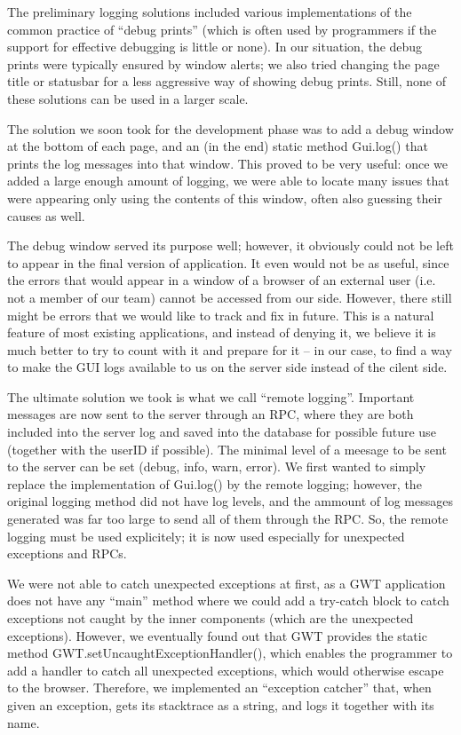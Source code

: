 The preliminary logging solutions included various implementations of the common practice of ``debug prints'' (which is often used by programmers if the support for effective debugging is little or none). In our situation, the debug prints were typically ensured by window alerts; we also tried changing the page title or statusbar for a less aggressive way of showing debug prints. Still, none of these solutions can be used in a larger scale.

The solution we soon took for the development phase was to add a debug window at the bottom of each page, and an (in the end) static method Gui.log() that prints the log messages into that window.
This proved to be very useful: once we added a large enough amount of logging, we were able to locate many issues that were appearing only using the contents of this window, often also guessing their causes as well.

The debug window served its purpose well; however, it obviously could not be left to appear in the final version of application.
It even would not be as useful, since the errors that would appear in a window of a browser of an external user (i.e. not a member of our team) cannot be accessed from our side.
However, there still might be errors that we would like to track and fix in future. This is a natural feature of most existing applications, and instead of denying it, we believe it is much better to try to count with it and prepare for it -- in our case, to find a way to make the GUI logs available to us on the server side instead of the cilent side.

The ultimate solution we took is what we call ``remote logging''. Important messages are now sent to the server through an RPC, where they are both included into the server log and saved into the database for possible future use (together with the userID if possible).
The minimal level of a meesage to be sent to the server can be set (debug, info, warn, error).
We first wanted to simply replace the implementation of Gui.log() by the remote logging; however, the original logging method did not have log levels, and the ammount of log messages generated was far too large to send all of them through the RPC. So, the remote logging must be used explicitely; it is now used especially for unexpected exceptions and RPCs.

We were not able to catch unexpected exceptions at first, as a GWT application does not have any ``main'' method where we could add a try-catch block to catch exceptions not caught by the inner components (which are the unexpected exceptions).
However, we eventually found out that GWT provides the static method GWT.setUncaughtExceptionHandler(), which enables the programmer to add a handler to catch all unexpected exceptions, which would otherwise escape to the browser.
Therefore, we implemented an ``exception catcher'' that, when given an exception, gets its stacktrace as a string, and logs it together with its name.


